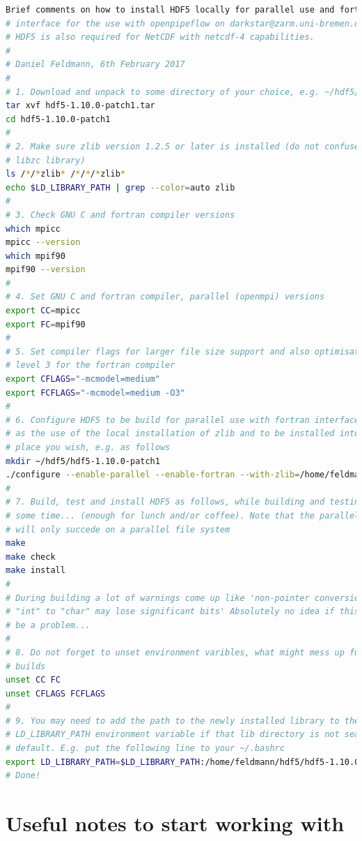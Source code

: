 \documentclass[a4paper, 11pt, DIV=11]{scrartcl}
\begin{document}
\begin{lstlisting}[language=bash]
 Brief comments on how to install HDF5 locally for parallel use and fortran
# interface for the use with openpipeflow on darkstar@zarm.uni-bremen.de
# HDF5 is also required for NetCDF with netcdf-4 capabilities.
#
# Daniel Feldmann, 6th February 2017
# 
# 1. Download and unpack to some directory of your choice, e.g. ~/hdf5/build/.
tar xvf hdf5-1.10.0-patch1.tar
cd hdf5-1.10.0-patch1
#
# 2. Make sure zlib version 1.2.5 or later is installed (do not confuse with
# libzc library)
ls /*/*zlib* /*/*/*zlib*
echo $LD_LIBRARY_PATH | grep --color=auto zlib
#
# 3. Check GNU C and fortran compiler versions
which mpicc
mpicc --version
which mpif90
mpif90 --version
#
# 4. Set GNU C and fortran compiler, parallel (openmpi) versions
export CC=mpicc
export FC=mpif90
#
# 5. Set compiler flags for larger file size support and also optimisation
# level 3 for the fortran compiler
export CFLAGS="-mcmodel=medium"
export FCFLAGS="-mcmodel=medium -O3"
#
# 6. Configure HDF5 to be build for parallel use with fortran interface, as well
# as the use of the local installation of zlib and to be installed into some
# place you wish, e.g. as follows
mkdir ~/hdf5/hdf5-1.10.0-patch1
./configure --enable-parallel --enable-fortran --with-zlib=/home/feldmann/zlib/zlib-1.2.11 --prefix=/home/feldmann/hdf5/hdf5-1.10.0-patch1
#
# 7. Build, test and install HDF5 as follows, while building and testing take quite
# some time... (enough for lunch and/or coffee). Note that the parallel tests
# will only succede on a parallel file system
make
make check
make install
#
# During building a lot of warnings come up like 'non-pointer conversion from
# "int" to "char" may lose significant bits' Absolutely no idea if this might
# be a problem...
#
# 8. Do not forget to unset environment varibles, what might mess up future
# builds
unset CC FC
unset CFLAGS FCFLAGS
#
# 9. You may need to add the path to the newly installed library to the
# LD_LIBRARY_PATH environment variable if that lib directory is not searched by
# default. E.g. put the following line to your ~/.bashrc
export LD_LIBRARY_PATH=$LD_LIBRARY_PATH:/home/feldmann/hdf5/hdf5-1.10.0-patch1/lib
# Done!
\end{lstlisting}



\section{Useful notes to start working with }
\label{app:git}
\end{document}
